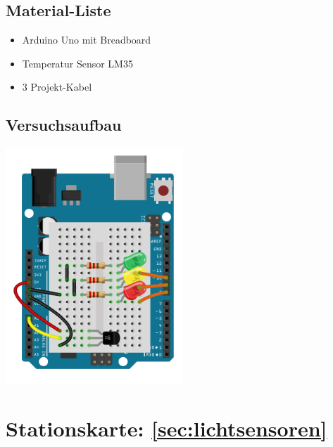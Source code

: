 \begin{multicols}{2}
\subsection*{Material-Liste}
\begin{itemize}
  \item Arduino Uno mit Breadboard
  \item Temperatur Sensor LM35
  \item 3 Projekt-Kabel
\end{itemize}


\vfill\null 
\columnbreak

\subsection*{Versuchsaufbau}

\includegraphics[width=0.5\textwidth]{Kapitel2/Bilder/temperatursensor}
\end{multicols}


\section*{Stationskarte: \ref{sec:lichtsensoren} }

